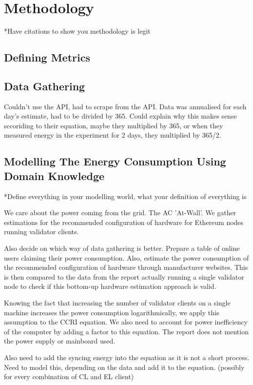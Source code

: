 \chapter {Methodology}
*Have citations to show you methodology is legit

\section {Defining Metrics}


\section {Data Gathering}

Couldn't use the API, had to scrape from the API. Data was annualised for each day's estimate, had to be divided by 365. Could explain why this makes sense sccoriding to their equation, maybe they multiplied by 365, or when they measured energy in the experiment for 2 days, they multiplied by 365/2.

\section {Modelling The Energy Consumption Using Domain Knowledge}

*Define everything in your modelling world, what your definition of everything is

We care about the power coming from the grid. The AC 'At-Wall'. We gather estimations for the recommended configuration of hardware for Ethereum nodes running validator clients. 

Also decide on which way of data gathering is better. Prepare a table of online users claiming their power consumption. Also, estimate the power consumption of the recommended configuration of hardware through manufacturer websites. This is then compared to the data from the \cite{CryptoCarbonRatingsInstitute2022TheNetwork} report actually running a single validator node to check if this bottom-up hardware estimation approach is valid. 

Knowing the fact that increasing the number of validator clients on a single machine increases the power consumption logarithmically, we apply this assumption to the CCRI equation. We also need to account for power inefficiency of the computer by adding a factor to this equation. The report does not mention the power supply or mainboard used.

Also need to add the syncing energy into the equation as it is not a short process. Need to model this, depending on the data and add it to the equation. (possibly for every combination of CL and EL client)


